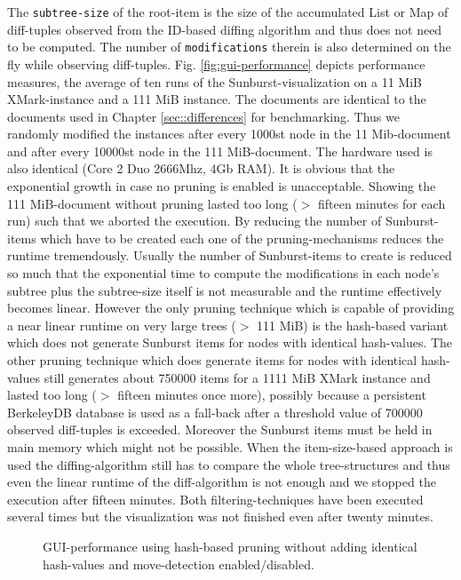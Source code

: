 The \texttt{subtree-size} of the root-item is the size of the accumulated List or Map of diff-tuples observed from the ID-based diffing algorithm and thus does not need to be computed. The number of \texttt{modifications} therein is also determined on the fly while observing diff-tuples. Fig. \ref{fig:gui-performance} depicts performance measures, the average of ten runs of the Sunburst-visualization on a 11 MiB XMark-instance and a 111 MiB instance. The documents are identical to the documents used in Chapter \ref{sec::differences} for benchmarking. Thus we randomly modified the instances after every 1000st node in the 11 Mib-document and after every 10000st node in the 111 MiB-document. The hardware used is also identical (Core 2 Duo 2666Mhz, 4Gb RAM). It is obvious that the exponential growth in case no pruning is enabled is unacceptable. Showing the 111 MiB-document without pruning lasted too long ($>$ fifteen minutes for each run) such that we aborted the execution. By reducing the number of Sunburst-items which have to be created each one of the pruning-mechanisms reduces the runtime tremendously. Usually the number of Sunburst-items to create is reduced so much that the exponential time to compute the modifications in each node's subtree plus the subtree-size itself is not measurable and the runtime effectively becomes linear. However the only pruning technique which is capable of providing a near linear runtime on very large trees ($>$ 111 MiB) is the hash-based variant which does not generate Sunburst items for nodes with identical hash-values. The other pruning technique which does generate items for nodes with identical hash-values still generates about 750000 items for a 1111 MiB XMark instance and lasted too long ($>$ fifteen minutes once more), possibly because a persistent BerkeleyDB database is used as a fall-back after a threshold value of 700000 observed diff-tuples is exceeded. Moreover the Sunburst items must be held in main memory which might not be possible. When the item-size-based approach is used the diffing-algorithm still has to compare the whole tree-structures and thus even the linear runtime of the diff-algorithm is not enough and we stopped the execution after fifteen minutes. Both filtering-techniques have been executed several times but the visualization was not finished even after twenty minutes. 

\begin{figure}[tb]
\caption{\label{fig:gui-performance-movedet} GUI-performance using hash-based pruning without adding identical hash-values and move-detection enabled/disabled.}
\end{figure}

